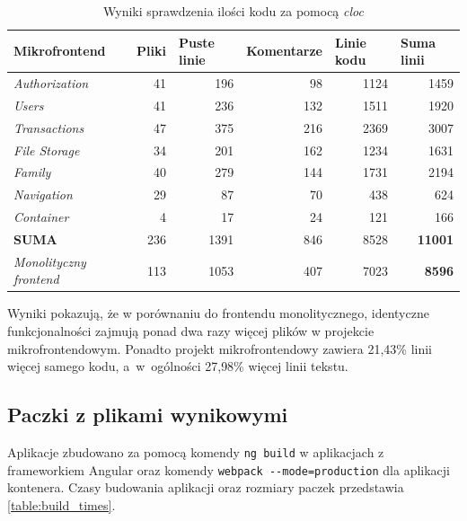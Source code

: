 \documentclass{SGGW-thesis}
\begin{document}
    \begin{table}[h]
      \centering
      \caption{Wyniki sprawdzenia ilości kodu za pomocą \textit{cloc}}
      \begin{tabular}{|l||r|r|r|r|r|}
      \hline
      \textbf{Mikrofrontend} & \multicolumn{1}{l|}{\textbf{Pliki}} & \multicolumn{1}{l|}{\textbf{Puste linie}} & \multicolumn{1}{l|}{\textbf{Komentarze}} & \multicolumn{1}{l|}{\textbf{Linie kodu}} & \multicolumn{1}{l|}{\textbf{Suma linii}} \\ \hline
      \textit{Authorization} & 41 & 196 & 98 & 1124 & 1459 \\ \hline
      \textit{Users} & 41 & 236 & 132 & 1511 & 1920 \\ \hline
      \textit{Transactions} & 47 & 375 & 216 & 2369 & 3007 \\ \hline
      \textit{File Storage} & 34 & 201 & 162 & 1234 & 1631 \\ \hline
      \textit{Family} & 40 & 279 & 144 & 1731 & 2194 \\ \hline
      \textit{Navigation} & 29 & 87 & 70 & 438 & 624 \\ \hline
      \textit{Container} & 4 & 17 & 24 & 121 & 166 \\ \hline
      \textbf{SUMA}& 236 & 1391 & 846 & 8528 & \textbf{11001} \\ \hline\hline
      \textit{Monolityczny frontend} & 113 & 1053 & 407 & 7023 & \textbf{8596} \\ \hline
      \end{tabular}
      \label{table:cloc}
    \end{table}

    Wyniki pokazują, że w porównaniu do frontendu monolitycznego, identyczne funkcjonalności zajmują ponad dwa razy więcej plików w projekcie mikrofrontendowym. Ponadto projekt mikrofrontendowy zawiera 21,43\% linii więcej samego kodu, a~w~ogólności 27,98\% więcej linii tekstu.
  
    \subsection{Paczki z plikami wynikowymi}
    Aplikacje zbudowano za pomocą komendy \lstinline{ng build} w aplikacjach z frameworkiem Angular oraz komendy \lstinline{webpack --mode=production} dla aplikacji kontenera. Czasy budowania aplikacji oraz rozmiary paczek przedstawia \cref{table:build_times}.
\end{document}

